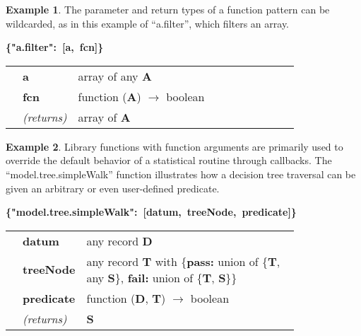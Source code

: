 \documentclass{article}
\newcommand{\PFAc}{\ttfamily\bfseries}
\newcommand{\PFAtp}{\ttfamily\bfseries}
\newcommand{\PFApf}{\ttfamily\bfseries}
\theoremstyle{definition}
\newtheorem{example}{Example}[section]
\begin{document}
\begin{example}
The parameter and return types of a function pattern can be wildcarded, as in this example of ``a.filter'', which filters an array.
\begin{center}
\begin{minipage}{0.9\linewidth}
\mbox{\PFAc \{"a.filter":$\!$ [a, fcn]\} \vspace{0.2 cm} \\} \vspace{0.2 cm} \\ \rm \begin{tabular}{p{0.01\linewidth} l p{0.8\linewidth}} & \PFAc a \rm & array of any {\PFAtp A} \\  & \PFAc fcn \rm & function ({\PFAtp A}) $\to$ boolean \\  & {\it (returns)} & array of {\PFAtp A} \\ \end{tabular}
\end{minipage}
\end{center}
\end{example}

\begin{example}
Library functions with function arguments are primarily used to override the default behavior of a statistical routine through callbacks.  The ``model.tree.simpleWalk'' function illustrates how a decision tree traversal can be given an arbitrary or even user-defined predicate.
\begin{center}
\begin{minipage}{0.9\linewidth}
\mbox{\PFAc \{"model.tree.simpleWalk":$\!$ [datum, treeNode, predicate]\} \vspace{0.2 cm} \\} \vspace{0.2 cm} \\ \rm \begin{tabular}{p{0.01\linewidth} l p{0.8\linewidth}} & \PFAc datum \rm & any record {\PFAtp D} \\  & \PFAc treeNode \rm & any record {\PFAtp T} with \{{\PFApf pass:}$\!$ union of \{{\PFAtp T}, any {\PFAtp S}\}, {\PFApf fail:}$\!$ union of \{{\PFAtp T}, {\PFAtp S}\}\} \\  & \PFAc predicate \rm & function ({\PFAtp D}, {\PFAtp T}) $\to$ boolean \\  & {\it (returns)} & {\PFAtp S} \\ \end{tabular}
\end{minipage}
\end{center}
\end{example}
\end{document}
